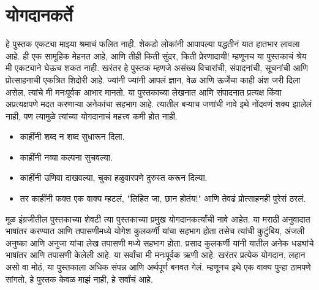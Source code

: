  \chapter{योगदानकर्ते}
हे पुस्तक एकट्या माझ्या श्रमाचं फलित नाही. शेकडो लोकांनी आपापल्या पद्धतीनं यात हातभार लावला आहे. ही एक सामूहिक मेहनत आहे, आणि तीही किती सुंदर, किती प्रेरणादायी!
म्हणूनच या पुस्तकाचं श्रेय मी एकट्याने घेऊच शकत नाही. खरंतर हे पुस्तक म्हणजे असंख्य विचारांची, संपादनांची, सूचनांची आणि प्रोत्साहनाची एकत्रित शिदोरी आहे. ज्यांनी ज्यांनी आपलं ज्ञान, वेळ आणि ऊर्जेचा काही अंश जरी दिला असेल, त्यांचे मी मनःपूर्वक आभार मानतो.
या पुस्तकाच्या लेखनात आणि संपादनात प्रत्यक्ष किंवा अप्रत्यक्षपणे मदत करणाऱ्या अनेकांचा सहभाग आहे. त्यातील बऱ्याच जणांची नावे इथे नोंदवणं शक्य झालेलं नाही, पण त्यामुळे त्यांच्या योगदानाचं महत्त्व कमी होत नाही.
\begin{itemize}
 \item काहींनी शब्द न शब्द सुधारून दिला.
 \item काहींनी नव्या कल्पना सुचवल्या.
 \item काहींनी उणिवा दाखवल्या, चुका हळुवारपणे दुरुस्त करून दिल्या.
 \item तर काहींनी फक्त एक वाक्य म्हटलं,  "लिहित जा, छान होतंय!" आणि तेवढं प्रोत्साहनही पुरेसं ठरलं.
 \end{itemize}
मूळ इंग्रजीतील पुस्तकाच्या शेवटी त्या पुस्तकाच्या प्रमुख योगदानकर्त्यांची नावे आहेत. या मराठी अनुवादात भाषांतर करण्यात आणि तपासणीमध्ये योगेश कुलकर्णी यांचा सहभाग होता तसेच त्यांची कुटुंबिय, अंजली अनुष्का आणि अनुजा यांचा लेख तपासणी मध्ये सहभाग होता. प्रसाद कुलकर्णी यांनी यातील अनेक धड्यांचे भाषांतर आणि तपासणी केलेली आहे.
या सर्वांचा मी मनःपूर्वक ऋणी आहे. खरंतर प्रत्येक योगदान, लहान असो वा मोठं, या पुस्तकाला अधिक संपन्न आणि अर्थपूर्ण बनवत गेलं.
म्हणूनच इथे एक वाक्य पुन्हा ठामपणे सांगतो,  हे पुस्तक केवळ माझं नाही, हे सर्वांचं आहे.

